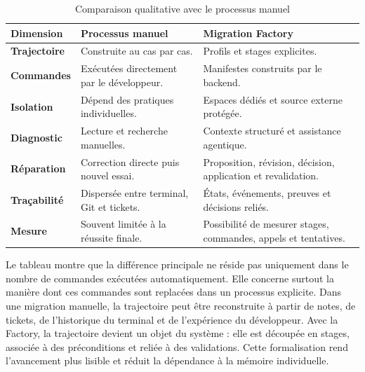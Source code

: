 \begin{table}[H]
    \centering
    \caption{Comparaison qualitative avec le processus manuel}
    \label{tab:comparaison-manuel-factory-ch5}
    \small
    \begin{tabularx}{\textwidth}{|>{\bfseries\RaggedRight\arraybackslash}p{3.5cm}|>{\RaggedRight\arraybackslash}p{5cm}|>{\RaggedRight\arraybackslash}X|}
        \hline
        \rowcolor{cgilight!95}
        \textbf{Dimension} & \textbf{Processus manuel} & \textbf{Migration Factory} \\
        \hline
        Trajectoire & Construite au cas par cas. & Profils et stages explicites. \\
        \hline
        Commandes & Exécutées directement par le développeur. & Manifestes construits par le backend. \\
        \hline
        Isolation & Dépend des pratiques individuelles. & Espaces dédiés et source externe protégée. \\
        \hline
        Diagnostic & Lecture et recherche manuelles. & Contexte structuré et assistance agentique. \\
        \hline
        Réparation & Correction directe puis nouvel essai. & Proposition, révision, décision, application et revalidation. \\
        \hline
        Traçabilité & Dispersée entre terminal, Git et tickets. & États, événements, preuves et décisions reliés. \\
        \hline
        Mesure & Souvent limitée à la réussite finale. & Possibilité de mesurer stages, commandes, appels et tentatives. \\
        \hline
    \end{tabularx}
\end{table}

Le tableau montre que la différence principale ne réside pas uniquement dans le nombre de commandes exécutées automatiquement. Elle concerne surtout la manière dont ces commandes sont replacées dans un processus explicite. Dans une migration manuelle, la trajectoire peut être reconstruite à partir de notes, de tickets, de l'historique du terminal et de l'expérience du développeur. Avec la Factory, la trajectoire devient un objet du système : elle est découpée en stages, associée à des préconditions et reliée à des validations. Cette formalisation rend l'avancement plus lisible et réduit la dépendance à la mémoire individuelle.

